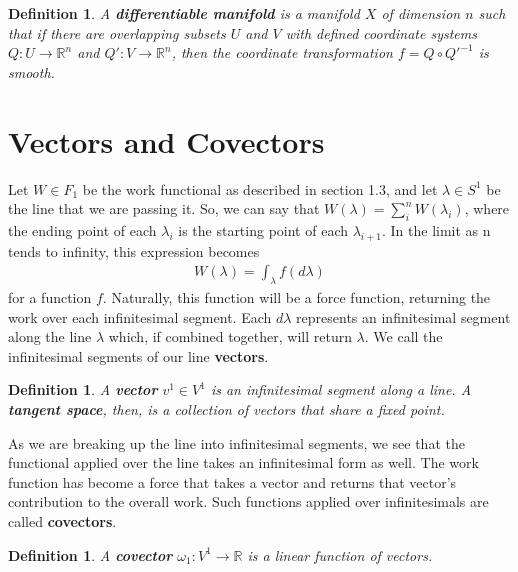 \documentclass{book}
\newtheorem{defn}[equation]{Definition}
\begin{document}
\begin{defn}
	A \textbf{differentiable manifold} is a manifold $X$ of dimension $n$ such that if there are overlapping subsets $U$ and $V$ with defined coordinate systems $Q: U \to \mathbb{R}^n$ and $Q': V \to \mathbb{R}^n$, then the coordinate transformation $f = Q \circ Q'^{-1}$ is smooth. 
\end{defn}







\section{Vectors and Covectors}



Let $W \in F_1$ be the work functional as described in section 1.3, and let $\lambda \in S^1$ be the line that we are passing it. So, we can say that $W(\lambda) = \sum^n_iW(\lambda_i)$, where the ending point of each $\lambda_i$ is the starting point of each $\lambda_{i+1}$. In the limit as n tends to infinity, this expression becomes \begin{gather}W(\lambda) = \int_{\lambda} f(d\lambda) \end{gather}for a function $f$. Naturally, this function will be a force function, returning the work over each infinitesimal segment. Each $d\lambda$ represents an infinitesimal segment along the line $\lambda$ which, if combined together, will return $\lambda$. We call the infinitesimal segments of our line \textbf{vectors}. 

\begin{defn}
	A \textbf{vector} $v^1 \in V^1$ is an infinitesimal segment along a line. A \textbf{tangent space}, then, is a collection of vectors that share a fixed point. 
\end{defn}

As we are breaking up the line into infinitesimal segments, we see that the functional applied over the line takes an infinitesimal form as well. The work function has become a force that takes a vector and returns that vector's contribution to the overall work. Such functions applied over infinitesimals are called \textbf{covectors}. 

\begin{defn}
	A \textbf{covector} $\omega_1 : V^1 \to \mathbb{R}$ is a linear function of vectors. 
\end{defn}
\end{document}
